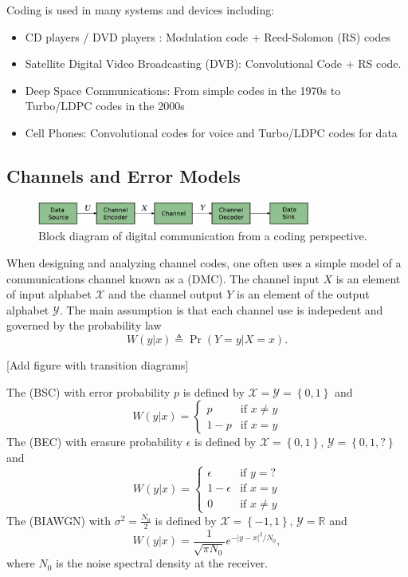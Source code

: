Coding is used in many systems and devices including:
\begin{itemize}
\item CD players / DVD players : Modulation code + Reed-Solomon (RS) codes
\item Satellite Digital Video Broadcasting (DVB): Convolutional Code + RS
code.
\item Deep Space Communications: From simple codes in the 1970s to Turbo/LDPC
codes in the 2000s
\item Cell Phones: Convolutional codes for voice and Turbo/LDPC codes for data
\end{itemize}

\subsection{Channels and Error Models}

\begin{figure}[t]
\begin{center}
\includegraphics[width=0.8\textwidth,keepaspectratio]{Figures/commfig2}
\end{center}
\vspace{-4mm}
\caption{Block diagram of digital communication from a coding perspective.}
\end{figure}

When designing and analyzing channel codes, one often uses a simple model of a communications channel known as a  (DMC).
The channel input $X$ is an element of input alphabet $\mathcal{X}$ and the channel output $Y$ is an element of the output alphabet $\mathcal{Y}$.
The main assumption is that each channel use is indepedent and governed by the probability law
\[ W(y|x) \triangleq \Pr\left(Y=y|X=x\right).\]

[Add figure with transition diagrams]

The  (BSC) with error probability $p$ is defined by $\mathcal{X}=\mathcal{Y}=\left\{ 0,1\right\} $ and
\[ W(y|x)=\begin{cases}
p & \mbox{if }x\neq y\\
1-p & \mbox{if }x=y\end{cases}\]
The  (BEC) with erasure probability $\epsilon$ is defined by $\mathcal{X}=\left\{ 0,1\right\} $, $\mathcal{Y}=\left\{ 0,1,?\right\}$ and
\[ W(y|x)=\begin{cases}
\epsilon & \mbox{if }y=?\\
1-\epsilon & \mbox{if }x=y\\
0 & \mbox{if }x\neq y\end{cases}\]
The  (BIAWGN) with $\sigma^{2}=\frac{N_{0}}{2}$ is defined by $\mathcal{X}=\left\{ -1,1\right\} $, $\mathcal{Y}=\mathbb{R}$ and
\[ W(y|x)=\frac{1}{\sqrt{\pi N_{0}}}e^{-\left|y-x\right|^{2}/N_{0}},\]
where $N_{0}$ is the noise spectral density at the receiver.

